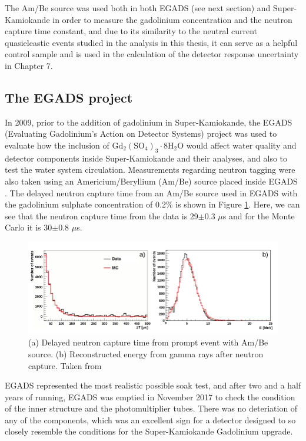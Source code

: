 The Am/Be source was used both in both EGADS (see next section) and Super-Kamiokande in order to measure the gadolinium concentration and the neutron capture time constant, and due to its similarity to the neutral current quasieleastic events studied in the analysis in this thesis, it can serve as a helpful control sample and is used in the calculation of the detector response uncertainty in Chapter 7. 

\subsection{The EGADS project}

In 2009, prior to the addition of gadolinium in Super-Kamiokande, the EGADS (Evaluating Gadolinium's Action on Detector Systems) project was used to evaluate how the inclusion of $\mathrm{Gd}_{2}\left(\mathrm{SO}_{4}\right)_{3} \cdot 8 \mathrm{H}_{2} \mathrm{O}$ would affect water quality and detector components inside Super-Kamiokande and their analyses, and also to test the water system circulation. Measurements regarding neutron tagging were also taken using an Americium/Beryllium (Am/Be) source placed inside EGADS \cite{magro2015egads}.
The delayed neutron capture time from an Am/Be source used in EGADS with the gadolinium sulphate concentration of 0.2\% is shown in Figure \ref{fig:EGADS_ambe_capture}. Here, we can see that the neutron capture time from the data is 29$\pm$0.3 $\mu$s and for the Monte Carlo it is 30$\pm$0.8 $\mu$s.

\begin{figure}
    \includegraphics[width=\textwidth]{Figures/egads_ambe.png}
\caption{(a) Delayed neutron capture time from prompt event with Am/Be source. (b) Reconstructed energy from gamma rays after neutron capture. Taken from \cite{marti_evaluation_2020}}
\label{fig:EGADS_ambe_capture}
\end{figure}


EGADS represented the most realistic possible soak test, and after two and a half years of running, EGADS was emptied in November 2017 to check the condition of the inner structure and the photomultiplier tubes. There was no deteriation of any of the components, which was an excellent sign for a detector designed to so closely resemble the conditions for the Super-Kamiokande Gadolinium upgrade. 

